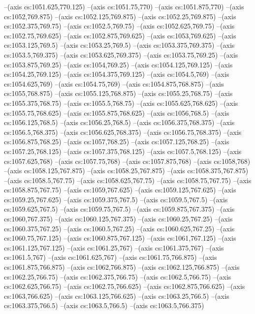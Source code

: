--(axis cs:1051.625,770.125)
--(axis cs:1051.75,770)
--(axis cs:1051.875,770)
--(axis cs:1052,769.875)
--(axis cs:1052.125,769.875)
--(axis cs:1052.25,769.875)
--(axis cs:1052.375,769.75)
--(axis cs:1052.5,769.75)
--(axis cs:1052.625,769.75)
--(axis cs:1052.75,769.625)
--(axis cs:1052.875,769.625)
--(axis cs:1053,769.625)
--(axis cs:1053.125,769.5)
--(axis cs:1053.25,769.5)
--(axis cs:1053.375,769.375)
--(axis cs:1053.5,769.375)
--(axis cs:1053.625,769.375)
--(axis cs:1053.75,769.25)
--(axis cs:1053.875,769.25)
--(axis cs:1054,769.25)
--(axis cs:1054.125,769.125)
--(axis cs:1054.25,769.125)
--(axis cs:1054.375,769.125)
--(axis cs:1054.5,769)
--(axis cs:1054.625,769)
--(axis cs:1054.75,769)
--(axis cs:1054.875,768.875)
--(axis cs:1055,768.875)
--(axis cs:1055.125,768.875)
--(axis cs:1055.25,768.75)
--(axis cs:1055.375,768.75)
--(axis cs:1055.5,768.75)
--(axis cs:1055.625,768.625)
--(axis cs:1055.75,768.625)
--(axis cs:1055.875,768.625)
--(axis cs:1056,768.5)
--(axis cs:1056.125,768.5)
--(axis cs:1056.25,768.5)
--(axis cs:1056.375,768.375)
--(axis cs:1056.5,768.375)
--(axis cs:1056.625,768.375)
--(axis cs:1056.75,768.375)
--(axis cs:1056.875,768.25)
--(axis cs:1057,768.25)
--(axis cs:1057.125,768.25)
--(axis cs:1057.25,768.125)
--(axis cs:1057.375,768.125)
--(axis cs:1057.5,768.125)
--(axis cs:1057.625,768)
--(axis cs:1057.75,768)
--(axis cs:1057.875,768)
--(axis cs:1058,768)
--(axis cs:1058.125,767.875)
--(axis cs:1058.25,767.875)
--(axis cs:1058.375,767.875)
--(axis cs:1058.5,767.75)
--(axis cs:1058.625,767.75)
--(axis cs:1058.75,767.75)
--(axis cs:1058.875,767.75)
--(axis cs:1059,767.625)
--(axis cs:1059.125,767.625)
--(axis cs:1059.25,767.625)
--(axis cs:1059.375,767.5)
--(axis cs:1059.5,767.5)
--(axis cs:1059.625,767.5)
--(axis cs:1059.75,767.5)
--(axis cs:1059.875,767.375)
--(axis cs:1060,767.375)
--(axis cs:1060.125,767.375)
--(axis cs:1060.25,767.25)
--(axis cs:1060.375,767.25)
--(axis cs:1060.5,767.25)
--(axis cs:1060.625,767.25)
--(axis cs:1060.75,767.125)
--(axis cs:1060.875,767.125)
--(axis cs:1061,767.125)
--(axis cs:1061.125,767.125)
--(axis cs:1061.25,767)
--(axis cs:1061.375,767)
--(axis cs:1061.5,767)
--(axis cs:1061.625,767)
--(axis cs:1061.75,766.875)
--(axis cs:1061.875,766.875)
--(axis cs:1062,766.875)
--(axis cs:1062.125,766.875)
--(axis cs:1062.25,766.75)
--(axis cs:1062.375,766.75)
--(axis cs:1062.5,766.75)
--(axis cs:1062.625,766.75)
--(axis cs:1062.75,766.625)
--(axis cs:1062.875,766.625)
--(axis cs:1063,766.625)
--(axis cs:1063.125,766.625)
--(axis cs:1063.25,766.5)
--(axis cs:1063.375,766.5)
--(axis cs:1063.5,766.5)
--(axis cs:1063.5,766.375)
